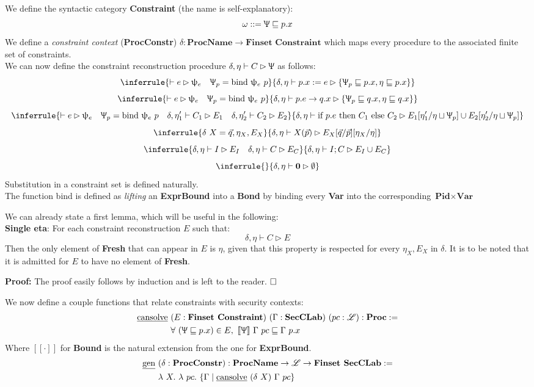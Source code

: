 \documentclass[12pt,a4paper,twoside]{book}
\newcommand{\llbracket}{[\![}
\newcommand{\rrbracket}{]\!]}
\newcommand{\MCL}{\mathscr{L}}
\newcommand{\qed}{\hfill\square}
\begin{document}
\noindent We define the syntactic category \textbf{Constraint} (the name is self-explanatory):
$$
\omega ::= \Uppsi \sqsubseteq p.x
$$
We define a \emph{constraint context} (\textbf{ProcConstr}) $\delta: \textbf{ProcName} \rightarrow \textbf{Finset Constraint}$ which maps every procedure to the associated finite set of constraints.\\
We can now define the constraint reconstruction procedure $\delta, \eta\vdash C\rhd\Uppsi$ as follows:
$$
\inferrule{\vdash e \rhd \uppsi_e\quad\Uppsi_p =\text{bind }\uppsi_e~p}
{\delta, \eta \vdash p.x := e \rhd \{\Uppsi_p \sqsubseteq p.x, \eta \sqsubseteq p.x\}}
$$
$$
\inferrule{\vdash e \rhd \uppsi_e\quad\Uppsi_p =\text{bind }\uppsi_e~p}
{\delta, \eta \vdash p.e \rightarrow q.x \rhd \{\Uppsi_p \sqsubseteq q.x, \eta \sqsubseteq q.x\}}
$$
$$
\inferrule{\vdash e \rhd \uppsi_e\quad\Uppsi_p =\text{bind }\uppsi_e~p\quad \delta,\eta_1'\vdash C_1 \rhd E_1 \quad \delta,\eta_2'\vdash C_2 \rhd E_2}
{\delta, \eta \vdash \text{if } p.e \text{ then } C_1 \text{ else } C_2 \rhd E_1[\eta_1' / \eta \sqcup \Uppsi_p] \cup E_2[\eta_2' / \eta \sqcup \Uppsi_p]}
$$
$$
\inferrule{\delta~X = \vec{q}, \eta_X, E_X}
{\delta, \eta \vdash X(\vec{p}) \rhd E_X[\vec{q}/\vec{p}][\eta_X/\eta]}
$$
$$
\inferrule{\delta, \eta \vdash I \rhd E_I \quad \delta, \eta \vdash C \rhd E_C}
{\delta, \eta \vdash I; C \rhd E_I \cup E_C}
$$
$$
\inferrule{}{\delta, \eta \vdash \boldsymbol{0} \rhd \emptyset}
$$
Substitution in a constraint set is defined naturally.\\
The function bind is defined as \emph{lifting} an \textbf{ExprBound} into a \textbf{Bond} by binding every \textbf{Var} into the corresponding $\textbf{Pid} \times \textbf{Var}$

We can already state a first lemma, which will be useful in the following:\\
\textbf{Single eta}: For each constraint reconstruction $E$ such that:
$$
\delta, \eta \vdash C \rhd E
$$
Then the only element of \textbf{Fresh} that can appear in $E$ is $\eta$, given that this property is respected for every $\eta_X, E_X$ in $\delta$. It is to be noted that it is admitted for $E$ to have no element of \textbf{Fresh}.

\noindent\textbf{Proof:} The proof easily follows by induction and is left to the reader. $\qed$

We now define a couple functions that relate constraints with security contexts:
\begin{align*}
\text{\underline{cansolve}}~&(E: \textbf{Finset Constraint})~(\Gamma: \textbf{SecCLab})~(pc: \MCL): \textbf{Proc} :=\\
&\forall~(\Uppsi \sqsubseteq p.x) \in E,~\llbracket \Uppsi \rrbracket~\Gamma~pc \sqsubseteq \Gamma~p.x
\end{align*}
Where $\llbracket \cdot\rrbracket$ for \textbf{Bound} is the natural extension from the one for \textbf{ExprBound}.
\begin{align*}
\text{\underline{gen}}~&(\delta: \textbf{ProcConstr}): \textbf{ProcName} \rightarrow \MCL \rightarrow \textbf{Finset SecCLab} :=\\
&\lambda~X.~\lambda~pc.~\{ \Gamma \mid \text{\underline{cansolve}}~(\delta~X)~\Gamma~pc\}
\end{align*}
\end{document}
